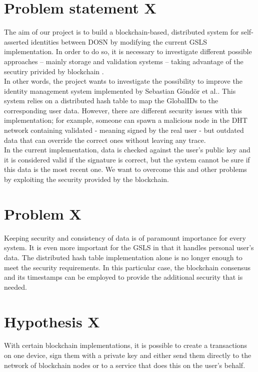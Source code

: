 \documentclass[paper=a4, fontsize=11pt]{scrartcl} %
\numberwithin{equation}{section} %
\numberwithin{figure}{section} %
\numberwithin{table}{section} %
\begin{document}
\section{Problem statement X}
The aim of our project is to build a blockchain-based, distributed system for self-asserted identities between DOSN \cite{blockchain-id-mgmt2017} by modifying the current GSLS implementation. In order to do so, it is necessary to investigate different possible approaches -- mainly storage and validation systems -- taking advantage of the secutiry privided by blockchain \cite{nakamoto2008bitcoin}. 
\\

In other words, the project wants to investigate the possibility to improve the identity management system implemented by Sebastian G{\"o}nd{\"o}r et al.\cite{gondor2016distributed}. This system relies on a distributed hash table to map the GlobalIDs to the corresponding user data. However, there are different security issues with this implementation; for example, someone can spawn a malicious node in the DHT network containing validated - meaning signed by the real user - but outdated data that can override the correct ones without leaving any trace. 
\\

In the current implementation, data is checked against the user’s public key and it is considered valid if the signature is correct, but the system cannot be sure if this data is the most recent one. We want to overcome this and other problems by exploiting the security provided by the blockchain. 

\section{Problem X}
Keeping security and consistency of data is of paramount importance for every system. It is even more important for the GSLS in that it handles personal user's data.  The distributed hash table implementation alone is no longer enough to meet the security requirements. In this particular case, the blockchain consensus and its timestamps can be employed to provide the additional security that is needed. 

\section{Hypothesis X}
With certain blockchain implementations, it is possible to create a transactions \cite{wood2014ethereum} on one device, sign them with a private key and either send them directly to the network of blockchain nodes or to a service that does this on the user's behalf. \\
\end{document}
